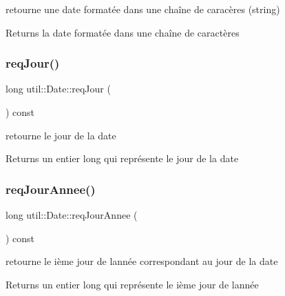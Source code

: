 retourne une date formatée dans une chaîne de caracères (string) 

\begin{DoxyReturn}{Returns}
la date formatée dans une chaîne de caractères 
\end{DoxyReturn}
\mbox{\label{classutil_1_1Date_aa2b8c7a6e23e9244a5bac8342484d3b8}} 
\subsubsection{\texorpdfstring{req\+Jour()}{reqJour()}}
{\footnotesize\ttfamily long util\+::\+Date\+::req\+Jour (\begin{DoxyParamCaption}{ }\end{DoxyParamCaption}) const}



retourne le jour de la date 

\begin{DoxyReturn}{Returns}
un entier long qui représente le jour de la date 
\end{DoxyReturn}
\mbox{\label{classutil_1_1Date_a9e76af410b6be9ac4ea9ab4df5797847}} 
\subsubsection{\texorpdfstring{req\+Jour\+Annee()}{reqJourAnnee()}}
{\footnotesize\ttfamily long util\+::\+Date\+::req\+Jour\+Annee (\begin{DoxyParamCaption}{ }\end{DoxyParamCaption}) const}



retourne le ième jour de l\textquotesingle{}année correspondant au jour de la date 

\begin{DoxyReturn}{Returns}
un entier long qui représente le ième jour de l\textquotesingle{}année 
\end{DoxyReturn}
\mbox{\label{classutil_1_1Date_a8002c391b812945da68b16cb4a424460}} 
